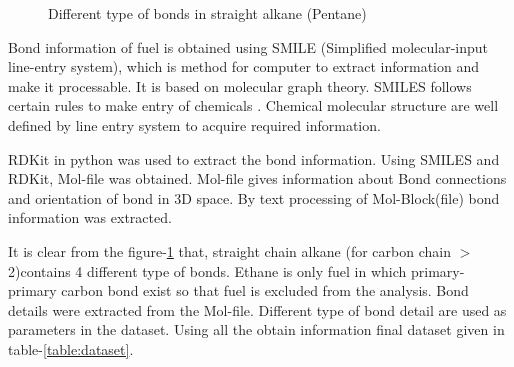 \documentclass[preprint,12pt]{elsarticle}
\begin{document}
\begin{figure}[htbp!]
{{{}
						\vspace{0.3cm}
							\caption{Different type of bonds in straight alkane (Pentane)}
							\label{fig:fuelbond}
							}
					     	}
						\end{figure}
							
							Bond information of fuel is obtained using SMILE (Simplified molecular-input line-entry system), which is method for computer to extract information and make it processable. It is based on molecular graph theory. SMILES follows certain rules to make entry of chemicals \cite{weininger1988smiles}. Chemical molecular structure are well defined by line entry system to acquire required information.
							
							RDKit \cite{rdkit} in python was used to extract the bond information. Using SMILES and RDKit, Mol-file was obtained. Mol-file gives information about Bond connections and orientation of bond in 3D space. By text processing of Mol-Block(file) bond information was extracted. 
							
						 It is clear from the figure-\ref{fig:fuelbond} that, straight chain alkane (for carbon chain $>$ 2)contains 4 different type of bonds. Ethane is only fuel in which primary-primary carbon bond exist so that fuel is excluded from the analysis. Bond details were extracted from the Mol-file. Different type of bond detail are used as parameters in the dataset. Using all the obtain information final dataset given in table-\ref{table:dataset}. 
						 
\end{document}
